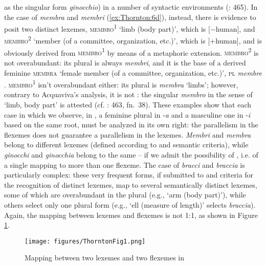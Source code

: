 \documentclass[output=paper]{langsci/langscibook}
\begin{document}
as the singular form \emph{ginocchio}) in a number of syntactic
environments 
(\citealt{Thornton2011b}: 465). In the case of
\emph{membra} and \emph{membri} (\ref{ex:Thornton:6d}), instead, there is evidence to
posit two distinct lexemes, \textsc{membro\textsuperscript{1}} `limb
(body part)', which is {[}$-$human{]}, and
\textsc{membro\textsuperscript{2}} `member (of a committee,
organization, etc.)', which is {[}+human{]}, and is obviously derived
from \textsc{membro\textsuperscript{1 }}by means of a metaphoric
extension. \textsc{membro\textsuperscript{2 }}is not overabundant: its
plural is always \emph{membri}, and it is the base of a derived feminine
\textsc{membra} `female member (of a committee, organization, etc.)',
\textsc{pl} \emph{membre} %
\citep{Thornton2014}%
%
.
\textsc{membro\textsuperscript{1 }}isn't overabundant either: its plural
is \emph{membra} `limbs'; however, contrary to Acquaviva's analysis, it
is not : the singular \emph{membro} in the sense of `limb, body
part' is attested 
(cf. \citealt{Thornton2011b}: 463, fn.~38). These
examples show that each case in which we observe, in , a feminine
plural in -\emph{a} and a masculine one in -\emph{i} based on the same
root, must be analyzed in its own right: the parallelism in the flexemes
does not guarantee a parallelism in the lexemes. \emph{Membri} and
\emph{membra} belong to different lexemes (defined according to %
%
and %
%
semantic criteria), while
\emph{ginocchi} and \emph{ginocchia} belong to the same  -- if we
admit the possibility of , i.e. of a single  mapping
to more than one flexeme. The case of \emph{bracci} and \emph{braccia}
is particularly complex: these very frequent forms, if submitted to
%
%
and %
%
criteria for the
recognition of distinct lexemes, map to several semantically distinct
lexemes, some of which are overabundant in the plural (e.g., `arm (body
part)'), while others select only one plural form (e.g., `ell (measure
of length)' selects \emph{braccia}). Again, the mapping between lexemes
and flexemes is not 1:1, as shown in Figure \ref{fig:Thornton:1}.

\begin{figure}
\texttt{[image: figures/ThorntonFig1.png]}
\caption{Mapping between two lexemes and two flexemes in }
\label{fig:Thornton:1}
\end{figure}
\end{document}

